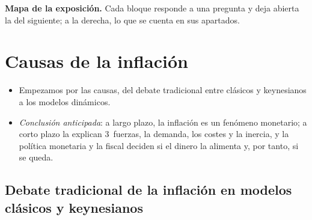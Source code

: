 \documentclass[11pt]{article}
\begin{document}
\begin{anotaciones}
\textbf{Mapa de la exposición.} Cada bloque responde a una pregunta y deja abierta la del siguiente; a la derecha, lo que se cuenta en sus apartados.
\begin{infografiacaja}
\caption{Mapa de la exposición: la pregunta de cada bloque y el hilo que los une}\label{figu:mapa-tema}
\end{infografiacaja}
\end{anotaciones}


\section{Causas de la inflación}\label{sec:causas}

\begin{itemize}
\item Empezamos por las causas, del debate tradicional entre clásicos y keynesianos a los modelos dinámicos.
\item \emph{Conclusión anticipada}: a largo plazo, la inflación es un fenómeno monetario; a corto plazo la explican 3~fuerzas, la demanda, los costes y la inercia, y la política monetaria y la fiscal deciden si el dinero la alimenta y, por tanto, si se queda.
\end{itemize}

\subsection{Debate tradicional de la inflación en modelos clásicos y keynesianos}\label{sec:debate-tradicional}
\end{document}
